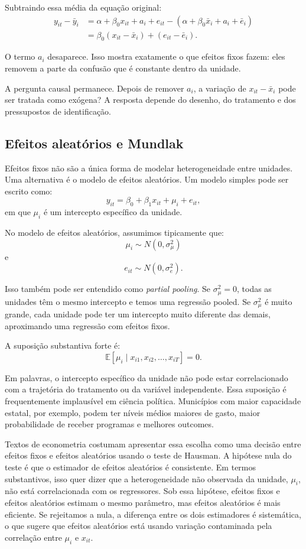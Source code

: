 \documentclass[
]{article}
\begin{document}
Subtraindo essa média da equação original:
\[
\begin{aligned}
y_{it} - \bar{y}_i
  &= \alpha + \beta_0 x_{it} + a_i + e_{it}
     - (\alpha + \beta_0 \bar{x}_i + a_i + \bar{e}_i) \\
  &= \beta_0(x_{it} - \bar{x}_i) + (e_{it} - \bar{e}_i).
\end{aligned}
\]

O termo \(a_i\) desaparece. Isso mostra exatamente o que efeitos fixos fazem: eles removem a parte da confusão que é constante dentro da unidade.

A pergunta causal permanece. Depois de remover \(a_i\), a variação de \(x_{it} - \bar{x}_i\) pode ser tratada como exógena? A resposta depende do desenho, do tratamento e dos pressupostos de identificação.

\subsection{Efeitos aleatórios e Mundlak}\label{efeitos-aleatuxf3rios-e-mundlak}

Efeitos fixos não são a única forma de modelar heterogeneidade entre unidades. Uma alternativa é o modelo de efeitos aleatórios. Um modelo simples pode ser escrito como:
\[
y_{it} = \beta_0 + \beta_1 x_{it} + \mu_i + e_{it},
\]
em que \(\mu_i\) é um intercepto específico da unidade.

No modelo de efeitos aleatórios, assumimos tipicamente que:
\[
\mu_i \sim N(0, \sigma^2_{\mu})
\]
e
\[
e_{it} \sim N(0, \sigma^2_e).
\]

Isso também pode ser entendido como \emph{partial pooling}. Se \(\sigma^2_{\mu} = 0\), todas as unidades têm o mesmo intercepto e temos uma regressão pooled. Se \(\sigma^2_{\mu}\) é muito grande, cada unidade pode ter um intercepto muito diferente das demais, aproximando uma regressão com efeitos fixos.

A suposição substantiva forte é:
\[
\mathbb{E}[\mu_i \mid x_{i1}, x_{i2}, \ldots, x_{iT}] = 0.
\]

Em palavras, o intercepto específico da unidade não pode estar correlacionado com a trajetória do tratamento ou da variável independente. Essa suposição é frequentemente implausível em ciência política. Municípios com maior capacidade estatal, por exemplo, podem ter níveis médios maiores de gasto, maior probabilidade de receber programas e melhores outcomes.

Textos de econometria costumam apresentar essa escolha como uma decisão entre efeitos fixos e efeitos aleatórios usando o teste de Hausman. A hipótese nula do teste é que o estimador de efeitos aleatórios é consistente. Em termos substantivos, isso quer dizer que a heterogeneidade não observada da unidade, \(\mu_i\), não está correlacionada com os regressores. Sob essa hipótese, efeitos fixos e efeitos aleatórios estimam o mesmo parâmetro, mas efeitos aleatórios é mais eficiente. Se rejeitamos a nula, a diferença entre os dois estimadores é sistemática, o que sugere que efeitos aleatórios está usando variação contaminada pela correlação entre \(\mu_i\) e \(x_{it}\).
\end{document}
